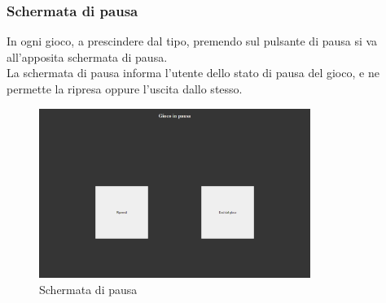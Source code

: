 \subsubsection{Schermata di pausa}
In ogni gioco, a prescindere dal tipo, premendo sul pulsante di pausa si va all'apposita schermata di pausa.\\
La schermata di pausa informa l'utente dello stato di pausa del gioco, e ne permette la ripresa oppure l'uscita dallo stesso.
\begin{figure}[h]
    \centering
    \includegraphics[width=250pt]{images/product/schermataPausaGioco.png}
    \caption{Schermata di pausa}
    \label{fig:schermataPausaGioco}
\end{figure}
\newpage
